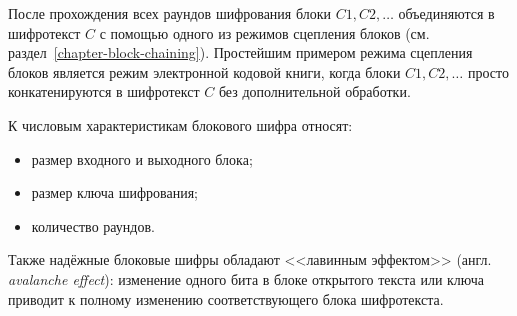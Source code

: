 После прохождения всех раундов шифрования блоки $C1, C2, \dots$ объединяются в шифротекст $C$ с помощью одного из режимов сцепления блоков (см. раздел~\ref{chapter-block-chaining}). Простейшим примером режима сцепления блоков является режим электронной кодовой книги, когда блоки $C1, C2, \dots$ просто конкатенируются в шифротекст $C$ без дополнительной обработки.

К числовым характеристикам блокового шифра относят:
\begin{itemize}
	\item размер входного и выходного блока;
	\item размер ключа шифрования;
	\item количество раундов.
\end{itemize}

Также надёжные блоковые шифры обладают <<лавинным эффектом>> (англ. \textit{avalanche effect}): изменение одного бита в блоке открытого текста или ключа приводит к полному изменению соответствующего блока шифротекста.